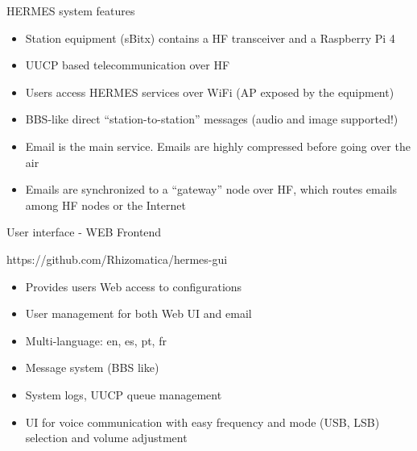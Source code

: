 \documentclass[aspectratio=169,xcolor={x11names,svgnames,dvipsnames}]{beamer}
\begin{document}
\begin{frame}{HERMES system features}

  \begin{itemize}
    \item Station equipment (sBitx) contains a HF transceiver and a Raspberry Pi 4
    \item UUCP based telecommunication over HF
    \item Users access HERMES services over WiFi (AP exposed by the equipment)
    \item BBS-like direct ``station-to-station'' messages (audio and image supported!)
    \item Email is the main service. Emails are highly compressed before going over the air
    \item Emails are synchronized to a ``gateway'' node over HF, which routes emails among HF nodes or the Internet
  \end{itemize}

\end{frame}


\begin{frame}{User interface - WEB Frontend}

\begin{block}{https://github.com/Rhizomatica/hermes-gui}
  \begin{itemize}
  \item Provides users Web access to configurations
  \item User management for both Web UI and email
  \item Multi-language: en, es, pt, fr
  \item Message system (BBS like)
  \item System logs, UUCP queue management
  \item UI for voice communication with easy frequency and mode (USB, LSB) selection and volume adjustment
  \end{itemize}
\end{block}

\end{frame}
\end{document}
